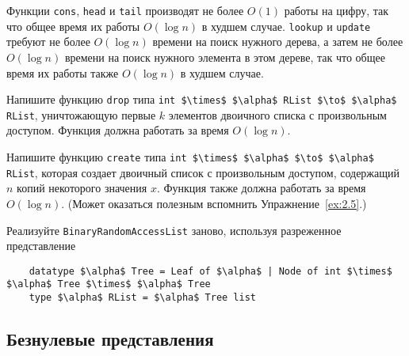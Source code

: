 \begin{frame}[fragile]{}

Функции \lstinline!cons!, \lstinline!head! и \lstinline!tail!
производят не более $O(1)$ работы на цифру, так что общее время их
работы $O(\log n)$ в худшем случае. \lstinline!lookup! и
\lstinline!update! требуют не более $O(\log n)$ времени на поиск
нужного дерева, а затем не более $O(\log n)$ времени на поиск нужного
элемента в этом дереве, так что общее время их работы также $O(\log
n)$ в худшем случае.

\begin{exercise}\label{ex:9.1}
  Напишите функцию \lstinline!drop! типа
  \lstinline!int $\times$ $\alpha$ RList $\to$ $\alpha$ RList!, уничтожающую первые $k$
  элементов двоичного списка с произвольным доступом. Функция должна
  работать за время $O(\log n)$.
\end{exercise}

\begin{exercise}\label{ex:9.2}
  Напишите функцию \lstinline!create! типа
  \lstinline!int $\times$ $\alpha$ $\to$ $\alpha$ RList!, которая создает
  двоичный список с произвольным доступом, содержащий $n$ копий
  некоторого значения $x$. Функция также должна работать за время
  $O(\log n)$. (Может оказаться полезным вспомнить Упражнение~\ref{ex:2.5}.)
\end{exercise}

\begin{exercise}\label{ex:9.3}
  Реализуйте \lstinline!BinaryRandomAccessList! заново, используя
  разреженное представление
  \begin{lstlisting}
    datatype $\alpha$ Tree = Leaf of $\alpha$ | Node of int $\times$ $\alpha$ Tree $\times$ $\alpha$ Tree
    type $\alpha$ RList = $\alpha$ Tree list
  \end{lstlisting}
\end{exercise}

\end{frame}

\subsection{Безнулевые представления}
\label{sc:9.2.2}

